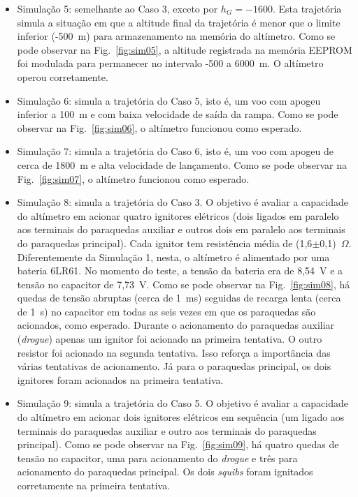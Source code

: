 \documentclass[12pt,a4paper]{article}
\begin{document}
\begin{itemize}
	\item Simulação 5: semelhante ao Caso 3, exceto por $h_G=-1600$. Esta trajetória simula a situação em que a altitude final da trajetória é menor que o limite inferior (-500~m) para armazenamento na memória do altímetro. Como se pode observar na Fig.~\ref{fig:sim05}, a altitude registrada na memória EEPROM foi modulada para permanecer no intervalo -500 a 6000~m. O altímetro operou corretamente.
	\item Simulação 6: simula a trajetória do Caso 5, isto é, um voo com apogeu inferior a 100~m e com baixa velocidade de saída da rampa. Como se pode observar na Fig.~\ref{fig:sim06}, o altímetro funcionou como esperado.
	\item Simulação 7: simula a trajetória do Caso 6, isto é, um voo com apogeu de cerca de 1800~m e alta velocidade de lançamento. Como se pode observar na Fig.~\ref{fig:sim07}, o altímetro funcionou como esperado.
	\item Simulação 8: simula a trajetória do Caso 3. O objetivo é avaliar a capacidade do altímetro em acionar quatro ignitores elétricos (dois ligados em paralelo aos terminais do paraquedas auxiliar e outros dois em paralelo aos terminais do paraquedas principal). Cada ignitor tem resistência média de (1,6$\pm$0,1)~$\Omega$. Diferentemente da Simulação 1, nesta, o altímetro é alimentado por uma bateria 6LR61. No momento do teste, a tensão da bateria era de 8,54~V e a tensão no capacitor de 7,73~V. Como se pode observar na Fig.~\ref{fig:sim08}, há quedas de tensão abruptas (cerca de 1~ms) seguidas de recarga lenta (cerca de 1~s) no capacitor em todas as seis vezes em que os paraquedas são acionados, como esperado. Durante o acionamento do paraquedas auxiliar (\textit{drogue}) apenas um ignitor foi acionado na primeira tentativa. O outro resistor foi acionado na segunda tentativa. Isso reforça a importância das várias tentativas de acionamento. Já para o paraquedas principal, os dois ignitores foram acionados na primeira tentativa.
	
	\item Simulação 9: simula a trajetória do Caso 5. O objetivo é avaliar a capacidade do altímetro em acionar dois ignitores elétricos em sequência (um ligado aos terminais do paraquedas auxiliar e outro aos terminais do paraquedas principal). Como se pode observar na Fig.~\ref{fig:sim09}, há quatro quedas de tensão no capacitor, uma para acionamento do \textit{drogue} e três para acionamento do paraquedas principal. Os dois \textit{squibs} foram ignitados corretamente na primeira tentativa.
\end{itemize}
\end{document}
